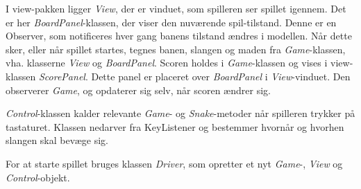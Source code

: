 I view-pakken ligger \textit{View}, der er vinduet, som spilleren ser spillet igennem. Det er her \textit{BoardPanel}-klassen, der viser den nuværende spil-tilstand. Denne er en Observer, som notificeres hver gang banens tilstand ændres i modellen. Når dette sker, eller når spillet startes, tegnes banen, slangen og maden fra \textit{Game}-klassen, vha. klasserne \textit{View} og \textit{BoardPanel}. Scoren holdes i \textit{Game}-klassen og vises i view-klassen \textit{ScorePanel}. Dette panel er placeret over \textit{BoardPanel} i \textit{View}-vinduet. Den observerer \textit{Game}, og opdaterer sig selv, når scoren ændrer sig.

\textit{Control}-klassen kalder relevante \textit{Game}- og \textit{Snake}-metoder når spilleren trykker på tastaturet. Klassen nedarver fra KeyListener og bestemmer hvornår og hvorhen slangen skal bevæge sig.

For at starte spillet bruges klassen \textit{Driver}, som opretter et nyt \textit{Game}-, \textit{View} og \textit{Control}-objekt.